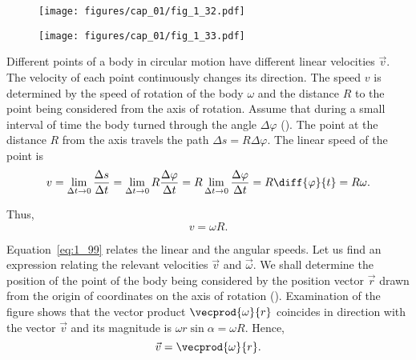 \begin{figure}[t]
	\begin{minipage}[t]{0.5\linewidth}
		\begin{center}
			\texttt{[image: figures/cap\_01/fig\_1\_32.pdf]}
			\caption[]{}
			\label{fig:1_32}
		\end{center}
	\end{minipage}
	\hspace{-0.1cm}
	\begin{minipage}[t]{0.5\linewidth}
		\begin{center}
			\texttt{[image: figures/cap\_01/fig\_1\_33.pdf]}
			\caption[]{}
			\label{fig:1_33}
		\end{center}
	\end{minipage}
	\vspace{-0.6cm}
\end{figure}

Different points of a body in circular motion have different linear velocities $\vec{v}$. The velocity of each point continuously changes its direction. The speed $v$ is determined by the speed of rotation of the body $\omega$ and the distance $R$ to the point being considered from the axis of rotation. Assume that during a small interval of time the body turned through the angle $\Delta\varphi$ (). The point at the distance $R$ from the axis travels the path $\Delta s=R\Delta\varphi$. The linear speed of the point is
\begin{equation*}
v = \lim_{\Delta t\to 0} \frac{\Delta s}{\Delta t} = \lim_{\Delta t\to 0} R\frac{\Delta\varphi}{\Delta t} = R \lim_{\Delta t\to 0} \frac{\Delta\varphi}{\Delta t} = R\diff{\varphi}{t} = R\omega.
\end{equation*}

\noindent
Thus,
\begin{equation}\label{eq:1_99}
v = \omega R.
\end{equation}

Equation~\eqref{eq:1_99} relates the linear and the angular speeds. Let us find an expression relating the relevant velocities $\vec{v}$ and $\vec{\omega}$. We shall determine the position of the point of the body being considered by the position vector $\vec{r}$ drawn from the origin of coordinates on the axis of rotation (). Examination of the figure shows that the vector product $\vecprod{\omega}{r}$ coincides in direction with the vector $\vec{v}$ and its magnitude is $\omega r\sin\alpha=\omega R$. Hence,
\begin{equation}\label{eq:1_100}
\vec{v} = \vecprod{\omega}{r}.
\end{equation}

